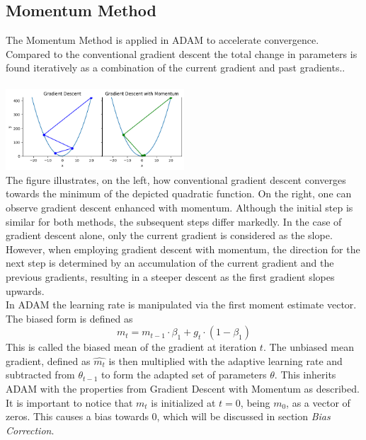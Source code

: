 \documentclass[journal]{IEEEtran}
\begin{document}
\subsection{Momentum Method}
The Momentum Method is applied in ADAM to accelerate convergence. Compared to the conventional gradient descent the total change in parameters is found iteratively as a combination of the current gradient and past gradients.. \\\\
\includegraphics[width=0.5\textwidth]{report/figures/GD_momentum.png}\\
The figure illustrates, on the left, how conventional gradient descent converges towards the minimum of the depicted quadratic function. On the right, one can observe gradient descent enhanced with momentum. Although the initial step is similar for both methods, the subsequent steps differ markedly. In the case of gradient descent alone, only the current gradient is considered as the slope. However, when employing gradient descent with momentum, the direction for the next step is determined by an accumulation of the current gradient and the previous gradients, resulting in a steeper descent as the first gradient slopes upwards.\\
In ADAM the learning rate is manipulated via the first moment estimate vector. The biased form is defined as 
$$m_t=m_{t-1}\cdot \beta_1 + g_t\cdot (1-\beta_1)$$
This is called the biased mean of the gradient at iteration $t$. The unbiased mean gradient, defined as $\hat{m_t}$ is then multiplied with the adaptive learning rate and subtracted from $\theta_{t-1}$ to form the adapted set of parameters $\theta$. This inherits ADAM with the properties from Gradient Descent with Momentum as described.\\
It is important to notice that $m_t$ is initialized at $t=0$, being $m_0$, as a vector of zeros. This causes a bias towards $0$, which will be discussed in section \textit{Bias Correction}.
\end{document}
